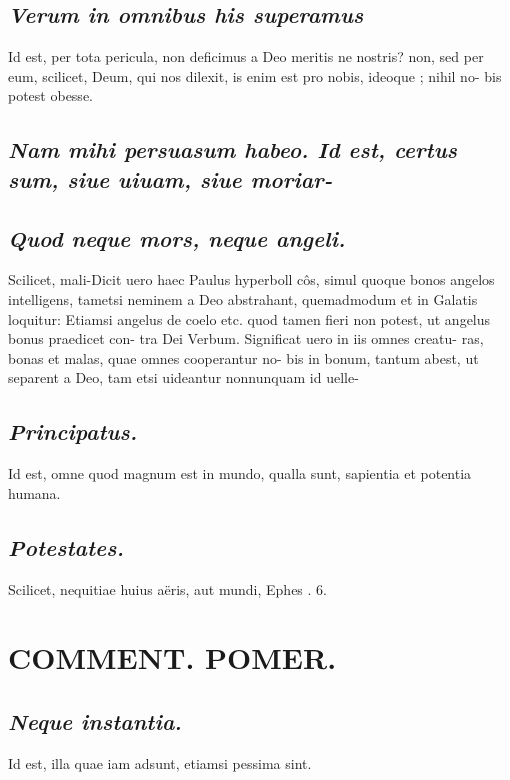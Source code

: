 \documentclass{article}
\begin{document}
\begin{pages}
\subsection*{\textit{Verum in omnibus his superamus }}\pstart Id est, per tota pericula, non deficimus a Deo meritis ne nostris? non, sed per eum, scilicet, Deum, qui nos dilexit, is enim est pro nobis, ideoque ; nihil no- bis potest obesse.   \pend
{}
{}
\subsection*{\textit{Nam mihi persuasum habeo. Id est, certus sum, siue uiuam, siue moriar- }}
{}
\subsection*{\textit{Quod neque mors, neque angeli. }}\pstart Scilicet, mali-Dicit uero haec Paulus hyperboll côs, simul quoque bonos angelos intelligens, tametsi neminem a Deo abstrahant, quemadmodum et in Galatis loquitur: Etiamsi angelus de coelo etc. quod tamen fieri non potest, ut angelus bonus praedicet con- tra Dei Verbum. Significat uero in iis omnes creatu- ras, bonas et malas, quae omnes cooperantur no- bis in bonum, tantum abest, ut separent a Deo, tam etsi uideantur nonnunquam id uelle-  \pend
{}
{}
\subsection*{\textit{Principatus. }}\pstart Id est, omne quod magnum est in mundo, qualla sunt, sapientia et potentia humana.   \pend
{}
{}
\subsection*{\textit{Potestates. }}\pstart Scilicet, nequitiae huius aëris, aut mundi, Ephes . 6.   \pend
\section*{COMMENT. POMER.  }
{}
\subsection*{\textit{Neque instantia. }}\pstart Id est, illa quae iam adsunt, etiamsi pessima sint.   \pend
{}
{}

\end{pages}
\end{document}
